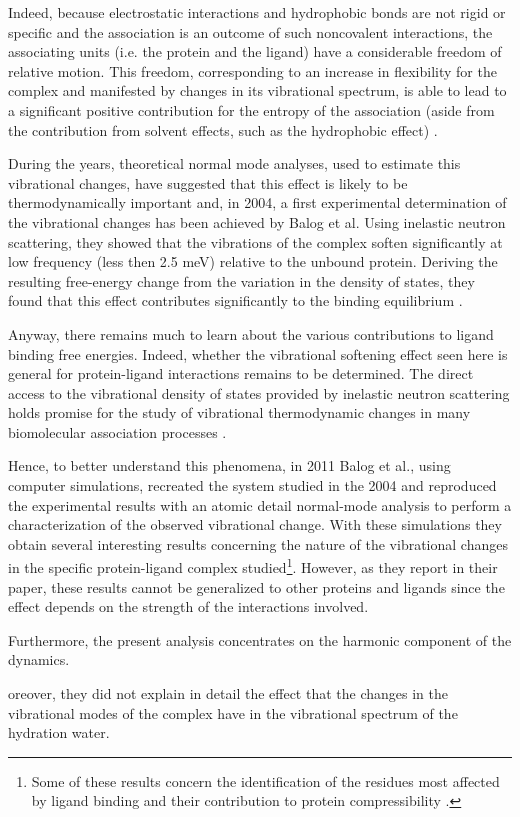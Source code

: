 Indeed, because electrostatic interactions and hydrophobic bonds are not rigid or specific and the association is an outcome of such noncovalent interactions, the associating units (i.e. the protein and the ligand) have a considerable freedom of relative motion. This freedom, corresponding to an increase in flexibility for the complex and manifested by changes in its vibrational spectrum, is able to lead to a significant positive contribution for the entropy of the association (aside from the contribution from solvent effects, such as the hydrophobic effect) \cite{steinberg1963entropy}.

During the years, theoretical normal mode analyses, used to estimate this vibrational changes, have suggested that this effect is likely to be thermodynamically important and, in 2004, a first experimental determination of the vibrational changes has been achieved by Balog et al. Using inelastic neutron scattering, they showed that the vibrations of the complex soften significantly at low frequency (less then 2.5 meV) relative to the unbound protein. Deriving the resulting free-energy change from the variation in the density of states, they found that this effect contributes significantly to the binding equilibrium \cite{balog2004direct}.

Anyway, there remains much to learn about the various contributions to ligand binding free energies. Indeed, whether the vibrational softening effect seen here is general for protein-ligand interactions remains to be determined. The direct access to the vibrational density of states provided by inelastic neutron scattering holds promise for the study of vibrational thermodynamic changes in many biomolecular association processes \cite{balog2004direct}. 

Hence, to better understand this phenomena, in 2011 Balog et al., using computer simulations, recreated the system studied in the 2004 and reproduced the experimental results with an atomic detail normal-mode analysis to perform a characterization of the observed vibrational change.
With these simulations they obtain several interesting results concerning the nature of the vibrational changes in the specific protein-ligand complex studied\footnote{Some of these results concern the identification of the residues most affected by ligand binding and their contribution to protein compressibility \cite{balog2011vibrational}.}. However, as they report in their paper, these results cannot be generalized to other proteins and ligands since the effect depends on the strength of the interactions involved. 

Furthermore, the present analysis concentrates on the harmonic component of the dynamics.

oreover, they did not explain in detail the effect that the changes in the vibrational modes of the complex have in the vibrational spectrum of the hydration water.


